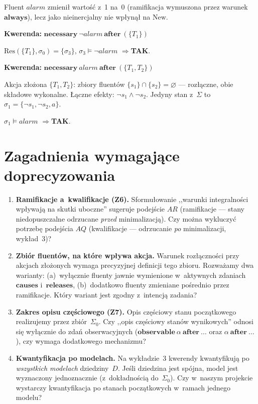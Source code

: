 \documentclass[11pt,a4paper]{article}
\newcommand{\causes}{\textbf{causes}}
\newcommand{\aft}{\textbf{after}}
\newcommand{\always}{\textbf{always}}
\newcommand{\releases}{\textbf{releases}}
\newcommand{\observable}{\textbf{observable}}
\newcommand{\necessary}{\textbf{necessary}}
\newcommand{\Res}{\mathrm{Res}}
\newcommand{\New}{\mathrm{New}}
\begin{document}
Fluent $\mathit{alarm}$ zmienił wartość z~1 na~0 (ramifikacja wymuszona
przez warunek $\always$), lecz jako nieinercjalny nie wpłynął na $\New$.

\medskip
\noindent\textbf{Kwerenda:} $\necessary\ \neg\mathit{alarm}\ \aft\ (\{T_1\})$

$\Res(\{T_1\}, \sigma_0) = \{\sigma_3\}$, \quad
$\sigma_3 \models \neg\mathit{alarm}$ \quad$\Rightarrow$\quad \textbf{TAK}.

\medskip
\noindent\textbf{Kwerenda:} $\necessary\ \mathit{alarm}\ \aft\ (\{T_1, T_2\})$

Akcja złożona $\{T_1, T_2\}$: zbiory fluentów $\{s_1\} \cap \{s_2\} = \varnothing$
--- rozłączne, obie składowe wykonalne. Łączne efekty: $\neg s_1 \land \neg s_2$.
Jedyny stan z~$\Sigma$ to $\sigma_1 = \{\neg s_1, \neg s_2, a\}$.

$\sigma_1 \models \mathit{alarm}$ \quad$\Rightarrow$\quad \textbf{TAK}.

\section{Zagadnienia wymagające doprecyzowania}

\begin{enumerate}
  \item \textbf{Ramifikacje a~kwalifikacje (Z6).}
    Sformułowanie ,,warunki integralności wpływają na skutki uboczne''
    sugeruje podejście $AR$ (ramifikacje --- stany niedopuszczalne
    odrzucane \emph{przed} minimalizacją).
    Czy można wykluczyć potrzebę podejścia $AQ$ (kwalifikacje ---
    odrzucanie \emph{po} minimalizacji, wykład~3)?

  \item \textbf{Zbiór fluentów, na które wpływa akcja.}
    Warunek rozłączności przy akcjach złożonych wymaga precyzyjnej
    definicji tego zbioru. Rozważamy dwa warianty:
    (a)~wyłącznie fluenty jawnie wymienione w~aktywnych zdaniach
    $\causes$ i~$\releases$,
    (b)~dodatkowo fluenty zmieniane pośrednio przez ramifikacje.
    Który wariant jest zgodny z~intencją zadania?

  \item \textbf{Zakres opisu częściowego (Z7).}
    Opis częściowy stanu początkowego realizujemy przez
    zbiór~$\Sigma_0$. Czy ,,opis częściowy stanów wynikowych''
    odnosi się wyłącznie do zdań obserwacyjnych
    ($\observable\ \alpha\ \aft\ \ldots$ oraz
    $\alpha\ \aft\ \ldots$), czy wymaga dodatkowego mechanizmu?

  \item \textbf{Kwantyfikacja po modelach.}
    Na wykładzie~3 kwerendy kwantyfikują po \emph{wszystkich modelach}
    dziedziny~$D$. Jeśli dziedzina jest spójna, model jest wyznaczony
    jednoznacznie (z~dokładnością do~$\Sigma_0$). Czy w~naszym projekcie
    wystarczy kwantyfikacja po stanach początkowych w~ramach jednego modelu?
\end{enumerate}
\end{document}
